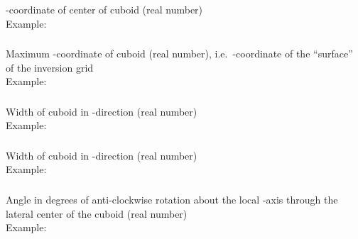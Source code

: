 \subsubsection{}
-coordinate of center of cuboid (real number)\\
Example:\\
\subsubsection{}
Maximum -coordinate of cuboid (real number), i.e.\ -coordinate of the 
``surface'' of the inversion grid\\
Example:\\
\subsubsection{}
Width of cuboid in -direction (real number)\\
Example:\\
\subsubsection{}
Width of cuboid in -direction (real number)\\
Example:\\
\subsubsection{}
Angle in degrees of anti-clockwise rotation about the local -axis through the 
lateral center of the cuboid (real number)\\
Example:\\
